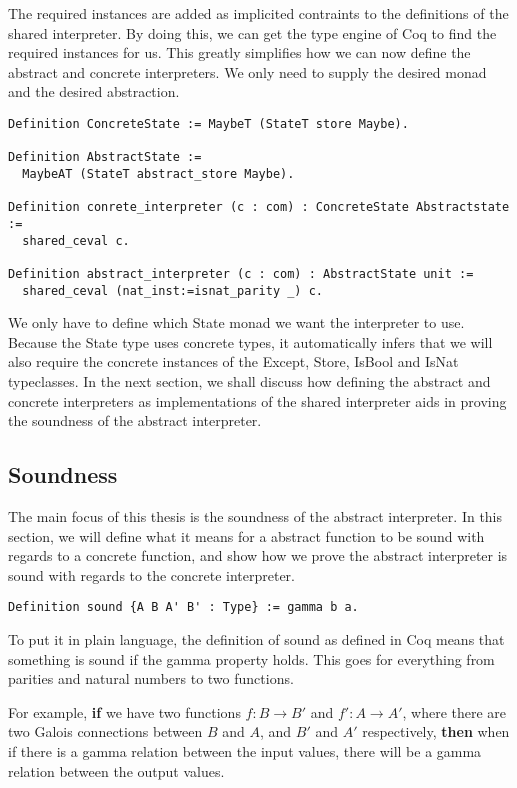 The required instances are added as implicited contraints to the definitions of
the shared interpreter. By doing this, we can get the type engine of Coq to
find the required instances for us. This greatly simplifies how we can now
define the abstract and concrete interpreters. We only need to supply the
desired monad and the desired abstraction.

\begin{verbatim}
Definition ConcreteState := MaybeT (StateT store Maybe).

Definition AbstractState := 
  MaybeAT (StateT abstract_store Maybe).

Definition conrete_interpreter (c : com) : ConcreteState Abstractstate :=
  shared_ceval c.

Definition abstract_interpreter (c : com) : AbstractState unit :=
  shared_ceval (nat_inst:=isnat_parity _) c.
\end{verbatim}

We only have to define which State monad we want the interpreter to use.
Because the State type uses concrete types, it automatically infers that we
will also require the concrete instances of the Except, Store, IsBool and IsNat
typeclasses. In the next section, we shall discuss how defining the abstract
and concrete interpreters as implementations of the shared interpreter aids in
proving the soundness of the abstract interpreter.

\subsection{Soundness}\label{sec:soundness}
The main focus of this thesis is the soundness of the abstract interpreter. In
this section, we will define what it means for a abstract function to be sound
with regards to a concrete function, and show how we prove the abstract 
interpreter is sound with regards to the concrete interpreter. 

\begin{verbatim}
Definition sound {A B A' B' : Type} := gamma b a.
\end{verbatim}

To put it in plain language, the definition of sound as defined in Coq means 
that something is sound if the gamma property holds. This goes for everything
from parities and natural numbers to two functions.

For example, \textbf{if} we have two functions $f : B \rightarrow B'$ and $f' 
: A \rightarrow A'$, where there are two Galois connections 
between $B$ and $A$, and $B'$ and $A'$ respectively, \textbf{then} when if 
there is a gamma relation between the input values, there will be a gamma
relation between the output values.

